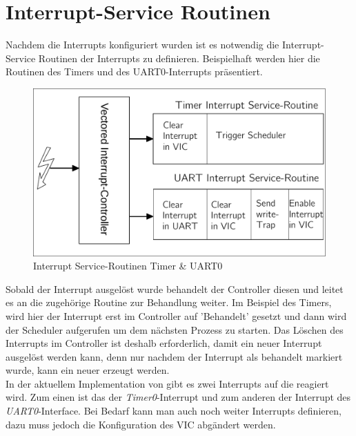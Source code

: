 \section{Interrupt-Service Routinen}
Nachdem die Interrupts konfiguriert wurden ist es notwendig die Interrupt-Service Routinen der Interrupts zu definieren. Beispielhaft werden hier die Routinen des Timers und des UART0-Interrupts pr\"asentiert.
\begin{figure}[H]
	\begin{center}	
	\caption{Interrupt Service-Routinen Timer \& UART0}
	\includegraphics[scale=0.60]{common/isr.pdf}
	\end{center}
\end{figure}
\noindent
Sobald der Interrupt ausgel\"ost wurde behandelt der Controller diesen und leitet es an die zugeh\"orige Routine zur Behandlung weiter. Im Beispiel des Timers, wird hier der Interrupt erst im Controller auf 'Behandelt' gesetzt und dann wird der Scheduler aufgerufen um dem n\"achsten Prozess zu starten. Das L\"oschen des Interrupts im Controller ist deshalb erforderlich, damit ein neuer Interrupt ausgel\"ost werden kann, denn nur nachdem der Interrupt als behandelt markiert wurde, kann ein neuer erzeugt werden. \\ In der aktuellem Implementation von \mops gibt es zwei Interrupts auf die reagiert wird. Zum einen ist das der \textit{Timer0}-Interrupt und zum anderen der Interrupt des \textit{UART0}-Interface. Bei Bedarf kann man auch noch weiter Interrupts definieren, dazu muss jedoch die Konfiguration des VIC abg\"andert werden.
